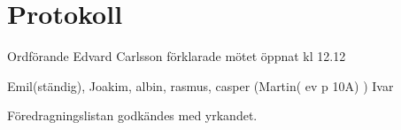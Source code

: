 \documentclass[10pt]{article}
\def\mo{Edvard Carlsson}
\begin{document}
\section*{Protokoll}
\begin{paragrafer}
Ordförande {\mo} förklarade mötet öppnat kl 12.12

{\valavmo}

{\valavms}

{\valavj}

{\tosg}


Emil(ständig), Joakim, albin, rasmus, casper
(Martin( ev p 10A) )
Ivar




Föredragningslistan godkändes med yrkandet.

\textit{\ingaprot}

\begin{fyllnadsval} %


\end{fyllnadsval}

\begin{paragrafer}


\end{paragrafer}
\end{paragrafer}
\end{document}
